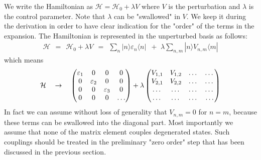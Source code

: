 \documentclass[onecolumn,fleqn, 11pt]{revtex4}
\newcommand{\amatrix}[1]{\begin{matrix} #1 \end{matrix}}
\newcommand{\beq}{\begin{eqnarray}}
\newcommand{\eeq}{\end{eqnarray}}
\begin{document}
We write the Hamiltonian as ${\mathcal{H}=\mathcal{H}_{0}+ \lambda V}$
where $V$ is the perturbation and ${\lambda}$ is the control parameter.  
Note that $\lambda$ can be "swallowed" in $V$. We keep it during 
the derivation in order to have clear indication for the "order" of the 
terms in the expansion. The Hamiltonian is represented in 
the unperturbed basis as follows: 
\beq
\mathcal{H}
\ \ = \ \ \mathcal{H}_{0}
+ \lambda V 
\ \ = \ \ \sum_{n} | n \rangle \varepsilon_{n} \langle n |
\,\,\, + \,\, 
\lambda \sum_{ n,m} | n \rangle V_{n,m} \langle m | 
\eeq
which means
\beq
\mathcal{H}
\ \ \ \rightarrow \ \ \  
\left(
\amatrix{
\varepsilon_{1} & 0 & 0 & 0 \cr 
0 & \varepsilon_{2} & 0 & 0 \cr 
0 & 0 & \varepsilon_{3} &0 \cr 
0 & 0 & 0 & \dots } 
\right) 
+ 
\lambda
\left(
\amatrix{
V_{1 , 1} & V_{1 , 2} & \dots  & \dots  \cr 
V_{2 , 1} & V_{2 , 2} & \dots  & \dots  \cr 
\dots  & \dots  & \dots  & \dots  \cr 
\dots  & \dots  & \dots  & \dots } 
\right) 
\eeq
In fact we can assume without loss of generality  
that ${V_{n,m} = 0}$ for ${n=m}$, because 
these terms can be swallowed into the diagonal part. 
Most importantly we assume that none of the 
matrix element couples degenerated states. 
Such couplings should be treated in the preliminary 
"zero order" step that has been discussed 
in the previous section. 
  
\end{document}
